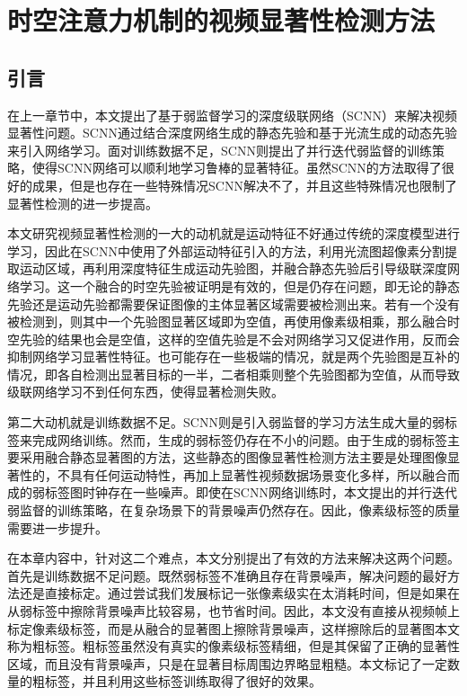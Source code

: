 \chapter{时空注意力机制的视频显著性检测方法}
\renewcommand{\leftmark}{第三章\quad 时空注意力机制的视频显著性检测方法}

\section{引言}
在上一章节中，本文提出了基于弱监督学习的深度级联网络（SCNN）来解决视频显著性问题。SCNN通过结合深度网络生成的静态先验和基于光流生成的动态先验来引入网络学习。面对训练数据不足，SCNN则提出了并行迭代弱监督的训练策略，使得SCNN网络可以顺利地学习鲁棒的显著特征。虽然SCNN的方法取得了很好的成果，但是也存在一些特殊情况SCNN解决不了，并且这些特殊情况也限制了显著性检测的进一步提高。

本文研究视频显著性检测的一大的动机就是运动特征不好通过传统的深度模型进行学习，因此在SCNN中使用了外部运动特征引入的方法，利用光流图超像素分割提取运动区域，再利用深度特征生成运动先验图，并融合静态先验后引导级联深度网络学习。这一个融合的时空先验被证明是有效的，但是仍存在问题，即无论的静态先验还是运动先验都需要保证图像的主体显著区域需要被检测出来。若有一个没有被检测到，则其中一个先验图显著区域即为空值，再使用像素级相乘，那么融合时空先验的结果也会是空值，这样的空值先验是不会对网络学习又促进作用，反而会抑制网络学习显著性特征。也可能存在一些极端的情况，就是两个先验图是互补的情况，即各自检测出显著目标的一半，二者相乘则整个先验图都为空值，从而导致级联网络学习不到任何东西，使得显著检测失败。

第二大动机就是训练数据不足。SCNN则是引入弱监督的学习方法生成大量的弱标签来完成网络训练。然而，生成的弱标签仍存在不小的问题。由于生成的弱标签主要采用融合静态显著图的方法，这些静态的图像显著性检测方法主要是处理图像显著性的，不具有任何运动特性，再加上显著性视频数据场景变化多样，所以融合而成的弱标签图时钟存在一些噪声。即使在SCNN网络训练时，本文提出的并行迭代弱监督的训练策略，在复杂场景下的背景噪声仍然存在。因此，像素级标签的质量需要进一步提升。

在本章内容中，针对这二个难点，本文分别提出了有效的方法来解决这两个问题。首先是训练数据不足问题。既然弱标签不准确且存在背景噪声，解决问题的最好方法还是直接标定。通过尝试我们发展标记一张像素级实在太消耗时间，但是如果在从弱标签中擦除背景噪声比较容易，也节省时间。因此，本文没有直接从视频帧上标定像素级标签，而是从融合的显著图上擦除背景噪声，这样擦除后的显著图本文称为粗标签。粗标签虽然没有真实的像素级标签精细，但是其保留了正确的显著性区域，而且没有背景噪声，只是在显著目标周围边界略显粗糙。本文标记了一定数量的粗标签，并且利用这些标签训练取得了很好的效果。

